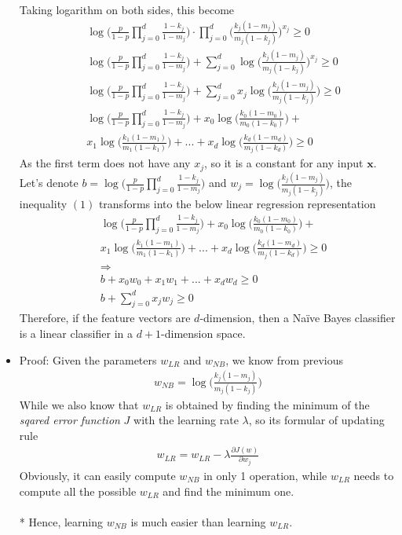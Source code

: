 \documentclass[a4paper]{scrartcl}
\begin{document}
\begin{itemize}
Taking logarithm on both sides, this become
\begin{align*}
 & \ \log{\Bigg(\frac{p}{1-p} {\displaystyle \prod_{j=0}^{d}} \frac{1-k_j}{1-m_j}\Bigg) \cdot {\displaystyle \prod_{j=0}^{d}} \Bigg(\frac{k_j(1-m_j)}{m_j(1-k_j)}\Bigg)^{x_j}} \geq 0\\
 & \ \log{\Bigg(\frac{p}{1-p} {\displaystyle \prod_{j=0}^{d}} \frac{1-k_j}{1-m_j}\Bigg)} + {\displaystyle \sum_{j=0}^{d}} \log{\Bigg(\frac{k_j(1-m_j)}{m_j(1-k_j)}\Bigg)^{x_j}} \geq 0\\
 & \ \log{\Bigg(\frac{p}{1-p} {\displaystyle \prod_{j=0}^{d}} \frac{1-k_j}{1-m_j}\Bigg)} + {\displaystyle \sum_{j=0}^{d}} x_j\log{\Bigg(\frac{k_j(1-m_j)}{m_j(1-k_j)}\Bigg)} \geq 0\\
 & \ \log{\Bigg(\frac{p}{1-p} {\displaystyle \prod_{j=0}^{d}} \frac{1-k_j}{1-m_j}\Bigg)} + x_0\log{\Bigg(\frac{k_0(1-m_0)}{m_0(1-k_0)}\Bigg)} + \\ &\ x_1\log{\Bigg(\frac{k_1(1-m_1)}{m_1(1-k_1)}\Bigg)}+...+ x_d\log{\Bigg(\frac{k_d(1-m_d)}{m_j(1-k_d)}\Bigg)}\geq 0
\end{align*}
As the first term does not have any $x_j$, so it is a constant for any input $\textbf{x}$.\\
Let's denote $b=\log{\Big(\frac{p}{1-p} {\displaystyle \prod_{j=0}^{d}} \frac{1-k_j}{1-m_j}\Big)}$ and $w_j=\log{\Big(\frac{k_j(1-m_j)}{m_j(1-k_j)}\Big)}$, the inequality $(1)$ transforms into the below linear regression representation\\
\begin{align*}
 & \ \log{\Bigg(\frac{p}{1-p} {\displaystyle \prod_{j=0}^{d}} \frac{1-k_j}{1-m_j}\Bigg)} + x_0\log{\Bigg(\frac{k_0(1-m_0)}{m_0(1-k_0)}\Bigg)} + \\ &\ x_1\log{\Bigg(\frac{k_1(1-m_1)}{m_1(1-k_1)}\Bigg)}+...+ x_d\log{\Bigg(\frac{k_d(1-m_d)}{m_j(1-k_d)}\Bigg)}\geq 0\\
 & \ \Rightarrow \\
 & \ b + x_0 w_0 + x_1 w_1 +...+ x_d w_d \geq 0\\
 & \ b + {\displaystyle \sum_{j=0}^{d}} x_j w_j \geq 0
\end{align*}
Therefore, if the feature vectors are $d$-dimension, then a Na\"ive Bayes classifier is
a linear classifier in a $d+1$-dimension space.
\item Proof: Given the parameters \textbf{$w_{LR}$} and \textbf{$w_{NB}$}, we know from previous
\begin{align*}
w_{NB}=\log{\Big(\frac{k_j(1-m_j)}{m_j(1-k_j)}\Big)}
\end{align*}
While we also know that \textbf{$w_{LR}$} is obtained by finding the minimum of the \textsl{sqared error function} $J$ with the learning rate $\lambda$, so its formular of updating rule
\begin{align*}
  w_{LR}= w_{LR} - \lambda \frac{\partial J(w) }{\partial w_j}
\end{align*}
Obviously, it can easily compute \textbf{$w_{NB}$} in only 1 operation, while \textbf{$w_{LR}$} needs to compute all the possible \textbf{$w_{LR}$} and find the minimum one.\\
\\*
Hence, learning \textbf{$w_{NB}$} is much easier than learning \textbf{$w_{LR}$}.
\end{itemize}
\end{document}
